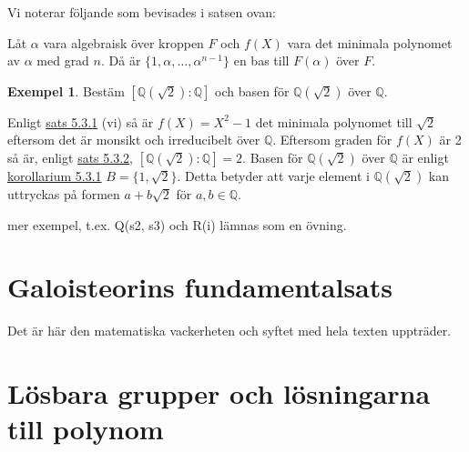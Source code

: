 \documentclass{article}
\theoremstyle{definition}
\newtheorem{exmp}[thm]{Exempel}
\begin{document}
Vi noterar följande som bevisades i satsen ovan: 
\hypertarget{kol5.3.1}{}
\begin{mykol}{}{}
  Låt $\alpha$ vara algebraisk över kroppen $F$ och $f(X)$ vara det minimala polynomet av $\alpha$ med grad $n$. 
  Då är $\{1, \alpha, \ldots, \alpha^{n-1}\}$ en bas till $F(\alpha)$ över $F$. 
\end{mykol}
\begin{exmp}
  Bestäm $[\mathbb{Q}(\sqrt{2}): \mathbb{\mathbb{Q}}]$ och basen för $\mathbb{Q}(\sqrt{2})$ över $\mathbb{Q}$.

  Enligt \hyperlink{minpol}{sats 5.3.1} (vi) så är $f(X) = X^2-1$ det minimala polynomet till $\sqrt{2}$ eftersom det är monsikt och irreducibelt över $\mathbb{Q}$. 
  Eftersom graden för $f(X)$ är 2 så är, enligt \hyperlink{5.3.2}{sats 5.3.2}, $[\mathbb{Q}(\sqrt{2}): \mathbb{\mathbb{Q}}] = 2.$ Basen för $\mathbb{Q}(\sqrt{2})$ över $\mathbb{Q}$
  är enligt \hyperlink{kol5.3.1}{korollarium 5.3.1} $B = \{1, \sqrt{2}\}$. Detta betyder att varje element i $\mathbb{Q}(\sqrt{2})$ kan uttryckas 
  på formen $a + b\sqrt{2}$ för $a, b \in \mathbb{Q}.$

\end{exmp}

mer exempel, t.ex. Q(s2, s3) och R(i) lämnas som en övning.
\section{Galoisteorins fundamentalsats}
Det är här den matematiska vackerheten och syftet med hela texten uppträder.
\section{Lösbara grupper och lösningarna till polynom}
\end{document}
